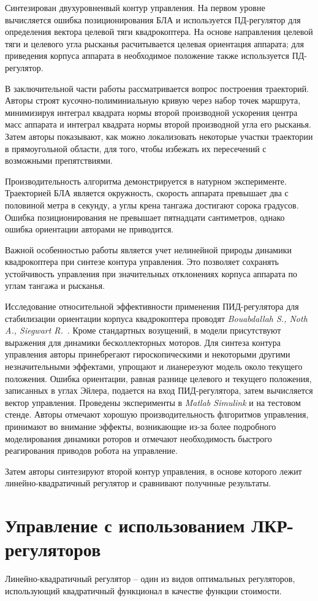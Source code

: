 \documentclass[a4paper,14pt,oneside,openany]{memoir}
\begin{document}
	Синтезирован двухуровненвый контур управления. На первом уровне вычисляется ошибка позиционирования БЛА и используется ПД-регулятор для определения вектора целевой тяги квадрокоптера. На основе направления целевой тяги и целевого угла рысканья расчитывается целевая ориентация аппарата; для приведения корпуса аппарата в необходимое положение также используется ПД-регулятор.
	
	В заключительной части работы рассматривается вопрос построения траекторий. Авторы строят кусочно-полиминиальную кривую через набор точек маршрута, минимизируя интеграл квадрата нормы второй производной ускорения центра масс аппарата и интеграл квадрата нормы второй производной угла его рысканья. Затем  авторы показывают, как можно локализовать некоторые участки траектории в прямоугольной области, для того, чтобы избежать их пересечений с возможными препятствиями.
	
	Производительность алгоритма демонстрируется в натурном эксперименте. Траекторией БЛА является окружность, скорость аппарата превышает два с половиной метра в секунду, а углы крена тангажа достигают сорока градусов. Ошибка позиционирования не превышает пятнадцати сантиметров, однако ошибка ориентации авторами не приводится.
	
	Важной особенностью работы является учет нелинейной природы динамики квадрокоптера при синтезе контура управления. Это позволяет сохранять устойчивость управления при значительных отклонениях корпуса аппарата по углам тангажа и рысканья.
	
	Исследование относительной эффективности применения ПИД-регулятора для стабилизации ориентации корпуса квадрокоптера проводят \textit{Bouabdallah S., Noth A., Siegwart R.}~\cite{Bouabdallah01}. Кроме стандартных возущений, в модели присутствуют выражения для динамики бесколлекторных моторов. Для синтеза контура управления авторы принебрегают гироскопическими и некоторыми другими незначительными эффектами, упрощают и лианерезуют модель около текущего положения. Ошибка ориентации, равная разнице целевого и текущего положения, записанных в углах Эйлера, подается на вход ПИД-регулятора, затем вычисляется вектор управления. Проведены эксперименты в \textit{Matlab Simulink} и на тестовом стенде. Авторы отмечают хорошую производительность флгоритмов управления, принимают во внимание эффекты, возникающие из-за более подробного моделирования динамики роторов и отмечают необходимость быстрого реагирования приводов робота на управление.
	
	Затем авторы синтезируют второй контур управления, в основе которого лежит линейно-квадратичный регулятор и сравнивают получнные результаты.
		
	
	\section{Управление с использованием ЛКР-регуляторов}
	
	Линейно-квадратичный регулятор -- один из видов оптимальных регуляторов, использующий квадратичный функционал в качестве функции стоимости.
	
	
	{}
	
\end{document}
